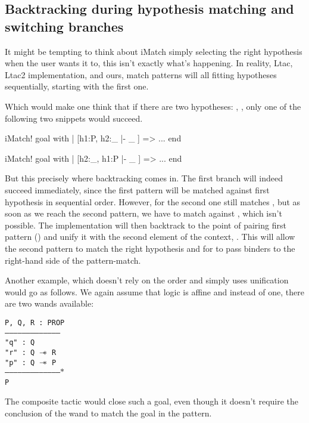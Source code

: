 \subsection{Backtracking during hypothesis matching and switching branches}

It might be tempting to think about iMatch simply selecting the right hypothesis when the user wants it to, this isn't exactly what's happening.
In reality, Ltac, Ltac2 implementation, and ours, match patterns will all fitting hypotheses sequentially, starting with the first one.

Which would make one think that if there are two hypotheses: , , only one of the following two snippets would succeed.
\begin{coq}
  iMatch! goal with
  | [h1:P, h2:_ |- _ ] => ...
  end
\end{coq}
\begin{coq}
  iMatch! goal with
  | [h2:_, h1:P |- _ ] => ...
  end
\end{coq}

But this precisely where backtracking comes in.
The first branch will indeed succeed immediately, since the first pattern will be matched against first hypothesis in sequential order.
However, for the second one  still matches \coqe{_}, but as soon as we reach the second pattern, we have to match  against , which isn't possible.
The implementation will then backtrack to the point of pairing first pattern (\coqe{_}) and unify it with the second element of the context, .
This will allow the second pattern to match the right hypothesis and for  to pass binders to the right-hand side of the pattern-match.

Another example, which doesn't rely on the order and simply uses unification would go as follows.
We again assume that logic is affine and instead of one, there are two wands available:

\begin{minipage}{\linewidth}
\texttt{P, Q, R : PROP\\
---------------------------------------\\
"q" : Q\\
"r" : Q $\mathrel{-\mkern-6mu*}$ R\\
"p" : Q $\mathrel{-\mkern-6mu*}$ P\\
--------------------------------------$\ast$\\
P
}
\end{minipage}

The composite tactic  would close such a goal, even though it doesn't require the conclusion of the wand to match the goal in the pattern.

